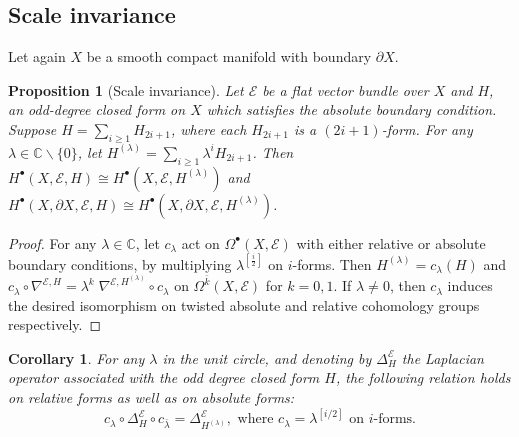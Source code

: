 \documentclass[12pt]{amsart}
\theoremstyle{plain}
\newtheorem{proposition}[theorem]{Proposition}
\newtheorem{corollary}[theorem]{Corollary}
\theoremstyle{definition}
\theoremstyle{remark}
\begin{document}
\subsection{Scale invariance} 

{{Let again $X$ be a smooth compact manifold  with boundary $\partial X$}}. 

\begin{proposition}[Scale invariance]\label{scaling}
Let ${\mathcal E}$ be a flat vector bundle over {{$X$}} and $H$, an odd-degree closed
form on ${{X}}$ {{which satisfies the absolute boundary condition}}.
Suppose $H=\sum_{i\ge1}H_{2i+1}$, where each $H_{2i+1}$ is a $(2i+1)$-form.
For any $\lambda\in{\mathbb{C}}\smallsetminus \{0\}$, let $H^{(\lambda)}=\sum_{i\ge1}\lambda^i H_{2i+1}$.
Then $H^\bullet(X,{\mathcal E},H)\cong H^\bullet(X,{\mathcal E},H^{(\lambda)})$
and  $H^\bullet(X, \partial X,{\mathcal E},H)\cong H^\bullet(X,\partial X, {\mathcal E},H^{(\lambda)})$.
\end{proposition}

\begin{proof}
For any $\lambda \in {\mathbb{C}}$, let $c_\lambda$ act on $\Omega^\bullet({{X}},{\mathcal E})$ 
with either relative or absolute boundary conditions, by 
multiplying $\lambda^{[\frac{i}{2}]}$ on $i$-forms.
Then $H^{(\lambda)}=c_\lambda(H)$ and
$c_\lambda\circ\nabla^{{\mathcal E},H}=\lambda^k\;\nabla^{{\mathcal E},H^{(\lambda)}}\circ
c_\lambda$ on $\Omega^{\bar k}({{X}},{\mathcal E})$ for $k=0,1$.
If $\lambda\ne0$, then $c_\lambda$ induces the desired isomorphism on
twisted {{absolute and relative}} cohomology groups respectively.
\end{proof}

{{
\begin{corollary}
For any $\lambda$ in the unit circle, and denoting by $\Delta^{\mathcal E}_H$ the Laplacian operator associated with the odd degree closed form $H$, the following relation holds on relative forms as well as on absolute forms:
$$
c_\lambda\circ \Delta^{\mathcal E}_H \circ c_{\bar\lambda} = \Delta^{\mathcal E}_{H^{(\lambda)}}, \text{ where } c_\lambda = \lambda^{[i/2]} \text{ on $i$-forms}.
$$
\end{corollary}
}}
\end{document}
